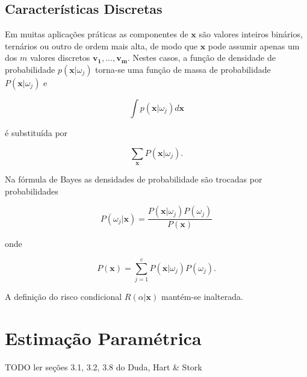 \documentclass[a4paper,12pt,twocolumn]{article}
\begin{document}
\subsection{Características Discretas}

Em muitas aplicações práticas as componentes de $\mathbf{x}$ são valores inteiros binários, ternários ou outro de ordem mais alta, de modo que $\mathbf{x}$ pode assumir apenas um dos $m$ valores discretos $\mathbf{v_1}, ..., \mathbf{v_m}$. Nestes casos, a função de densidade de probabilidade $p(\mathbf{x}|\omega_j)$ torna-se uma função de massa de probabilidade $P(\mathbf{x}|\omega_j)$ e

\begin{equation}
    \int p(\mathbf{x}|\omega_j) d\mathbf{x}
    \label{eq:integral_pdf}
\end{equation}

\noindent é substituída por

\begin{equation}
    \sum_\mathbf{x} P(\mathbf{x}|\omega_j).
    \label{eq:sum_pmf}
\end{equation}

\noindent Na fórmula de Bayes as densidades de probabilidade são trocadas por probabilidades

\begin{equation}
    P(\omega_j|\mathbf{x}) = \frac{P(\mathbf{x}|\omega_j)P(\omega_j)}{P(\mathbf{x})}
    \label{eq:bayes_discrete}
\end{equation}

onde

\begin{equation}
    P(\mathbf{x}) = \sum_{j=1}^c P(\mathbf{x}|\omega_j)P(\omega_j).
    \label{eq:bayes_discrete}
\end{equation}

A definição do risco condicional $R(\alpha|\mathbf{x})$ mantém-se inalterada.

\section{Estimação Paramétrica}

TODO ler seções 3.1, 3.2, 3.8 do Duda, Hart \& Stork
\end{document}
